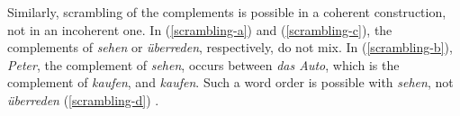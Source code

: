 \documentclass[output=paper]{langsci/langscibook}
\begin{document}
	
	\begin{exe}
	\ex  \label{german-coh}
	
	\begin{xlist}
		
		 \label{german-coh-a}
		
		 \label{german-coh-b}
		
		  \label{german-coh-c}
		
		  \label{german-coh-d}
		
		 \label{german-coh-e}
		
		 \label{german-coh-f}
		
	\end{xlist}
	
\end{exe}
	
	Similarly, scrambling of the complements is possible in a coherent construction, not in an incoherent one. In (\ref{scrambling-a}) and (\ref{scrambling-c}), the complements of \textit{sehen} or  \textit{\"uberreden}, respectively, do not mix. In (\ref{scrambling-b}), \textit{Peter}, the complement of \textit{sehen}, occurs between \textit{das Auto}, which is the complement of \textit{kaufen}, and \textit{kaufen}. Such 	a word order is possible with \textit{sehen}, not  \textit{\"uberreden} (\ref{scrambling-d}) \citep[examples from][]{HN98a}.
	
	
\end{document}
